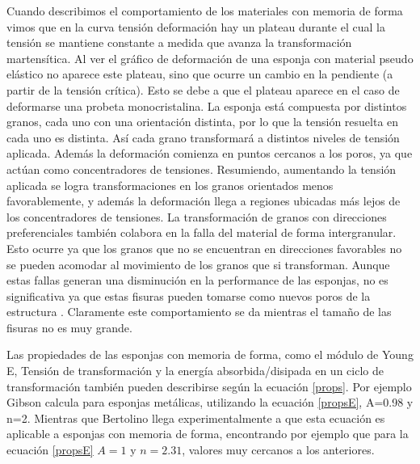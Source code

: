 \documentclass[a4paper,12pt,fleqn,twoside,openany]{book}
\begin{document}
Cuando describimos el comportamiento de los materiales con memoria de forma vimos que en la curva tensión deformación hay un plateau durante el cual la tensión se 
mantiene constante a medida que avanza la transformación martensítica. Al ver el gráfico de deformación de una esponja con material pseudo elástico no aparece este plateau, 
sino que ocurre un cambio en la pendiente (a partir de la tensión crítica). Esto se debe a que el plateau aparece en el caso de deformarse una probeta monocristalina. 
La esponja está compuesta por distintos granos, cada uno con una orientación distinta, por lo que la tensión resuelta en cada uno es distinta. Así cada grano transformará 
a distintos niveles de tensión aplicada. Además la deformación comienza en puntos cercanos a los poros, ya que actúan como concentradores de tensiones. Resumiendo, 
aumentando la tensión aplicada se logra transformaciones en los granos orientados menos favorablemente, y además la deformación llega a regiones ubicadas más lejos 
de los concentradores de tensiones.
La transformación de granos con direcciones preferenciales también colabora en la falla del material de forma intergranular. Esto ocurre ya que los granos que no se encuentran
en direcciones favorables no se pueden acomodar al movimiento de los granos que si transforman. Aunque estas fallas generan una disminución en la performance de las esponjas,
no es significativa ya que estas fisuras pueden tomarse como nuevos poros de la estructura \cite{bertolino2010}. Claramente este comportamiento se da mientras el tamaño de las fisuras no es muy 
grande.

Las propiedades de las esponjas con memoria de forma, como el módulo de Young E, Tensión de transformación y la energía absorbida/disipada en un ciclo de 
transformación también pueden describirse según la ecuación \ref{props}. Por ejemplo Gibson \cite{gibson} calcula para esponjas metálicas, utilizando la 
ecuación \ref{propsE}, A=0.98 y n=2. Mientras que Bertolino \cite{bertolino2011} llega experimentalmente a que esta ecuación es aplicable a esponjas 
con memoria de forma, encontrando por ejemplo que para la ecuación \ref{propsE} $A=1$ y $n=2.31$, valores muy cercanos a los anteriores.



\end{document}
